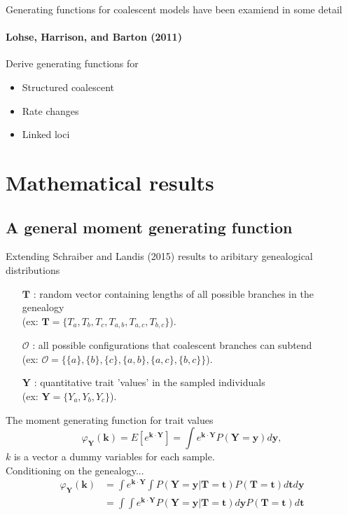 \documentclass{beamer}
\begin{document}
\begin{frame}{Generating functions for coalescent models have been examiend in some detail}
  \framesubtitle{Lohse, Harrison, and Barton (2011)}
  Derive generating functions for 
  \begin{itemize}
  \item Structured coalescent
  \item Rate changes
  \item Linked loci
  \end{itemize}
\end{frame}

\section{Mathematical results}
\subsection{A general moment generating function}
\begin{frame}{Extending Schraiber and Landis (2015) results to aribitary
    genealogical distributions}
  \begin{itemize}
  \item[$\mathbf{T}$] : random vector containing lengths of all possible
    branches in the genealogy \\(ex:
    $\mathbf{T}=\{T_a,T_b,T_c,T_{a,b},T_{a,c},T_{b,c}\}$).
  \item[$\mathcal{O}$] : all possible configurations that coalescent branches
    can subtend\\ (ex: $\mathcal{O}=\{\{a\},\{b\},\{c\},\{a,b\},\{a,c\},\{b,c\}\}$).
  \item[$\mathbf{Y}$] : quantitative trait 'values' in the sampled individuals\\
    (ex: $\mathbf{Y}=\{Y_a,Y_b,Y_c\}$).
  \end{itemize}
\end{frame}

\begin{frame}{The moment generating function for trait values}
  \begin{equation*}
    \varphi_{\mathbf{Y}}(\mathbf{k}) = E\left[ e^{\mathbf{k} \cdot \mathbf{Y}} \right] =
    \int e^{\mathbf{k} \cdot \mathbf{Y}} P(\mathbf{Y}=\mathbf{y}) d\mathbf{y},
  \end{equation*}
  $k$ is a vector a dummy variables for each sample. \\
  Conditioning on the genealogy...
  \begin{align}
    \varphi_{\mathbf{Y}}(\mathbf{k}) &= \int e^{\mathbf{k} \cdot \mathbf{Y}}
                                       \int P(\mathbf{Y}=\mathbf{y} | \mathbf{T}=\mathbf{t}) P(\mathbf{T}=\mathbf{t})
                                       d\mathbf{t} d\mathbf{y}\\
                                     &= \int \int e^{\mathbf{k} \cdot \mathbf{Y}} P(\mathbf{Y}=\mathbf{y} | \mathbf{T}=\mathbf{t}) d\mathbf{y}
                                       P(\mathbf{T}=\mathbf{t})
                                       d\mathbf{t}
  \end{align}
\end{frame}
\end{document}
